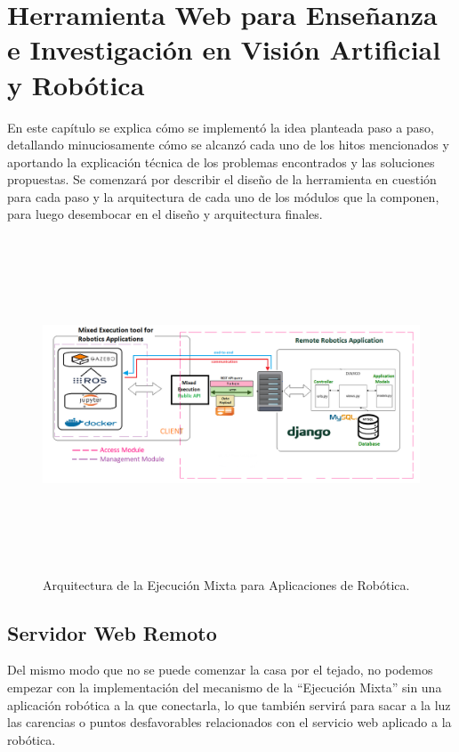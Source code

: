 \chapter{Herramienta Web para Enseñanza e Investigación en Visión Artificial y Robótica}
En este capítulo se explica cómo se implementó la idea planteada paso a paso, detallando minuciosamente cómo se alcanzó cada uno de los hitos mencionados y aportando la explicación técnica de los problemas encontrados y las soluciones propuestas. Se comenzará por describir el diseño de la herramienta en cuestión para cada paso y la arquitectura de cada uno de los módulos que la componen, para luego desembocar en el diseño y arquitectura finales.

\clearpage
\begin{figure}[!ht]  \centering\noindent
    \includegraphics[width=1.20\textwidth,height=10cm]{figures/ejecucion-mixta-infograma.png}
    \caption{Arquitectura de la Ejecución Mixta para Aplicaciones de Robótica.}
    \label{mixedexecarch}
\end{figure}

\section{Servidor Web Remoto}

Del mismo modo que no se puede comenzar la casa por el tejado, no podemos empezar con la implementación del mecanismo de la ``Ejecución Mixta'' sin una aplicación robótica a la que conectarla, lo que también servirá para sacar a la luz las carencias o puntos desfavorables relacionados con el servicio web aplicado a la robótica.

